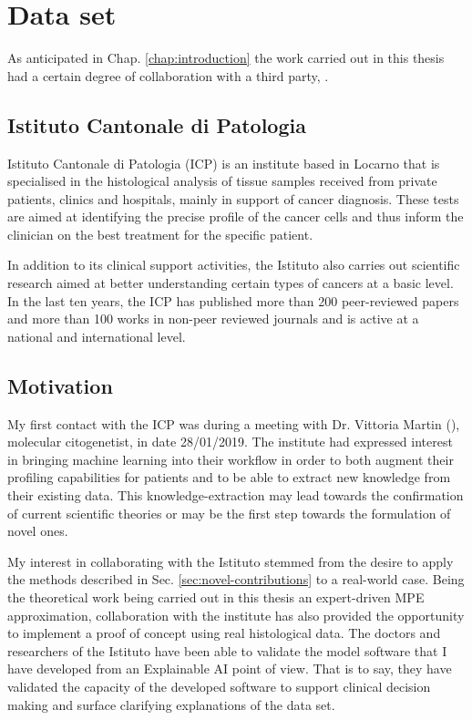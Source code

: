 
\section{Data set} \label{sec:data-set}
As anticipated in Chap. \ref{chap:introduction} the work carried out in this thesis had a certain degree of collaboration with a third party, \cite{istitutocantonalepresentazione}.

\subsection{Istituto Cantonale di Patologia}
Istituto Cantonale di Patologia (ICP) is an institute based in Locarno that is specialised in the histological analysis of tissue samples received from private patients, clinics and hospitals, mainly in support of cancer diagnosis.
These tests are aimed at identifying the precise profile of the cancer cells and thus inform the clinician on the best treatment for the specific patient.

In addition to its clinical support activities, the Istituto also carries out scientific research aimed at better understanding certain types of cancers at a basic level.
In the last ten years, the ICP has published more than 200 peer-reviewed papers and more than 100 works in non-peer reviewed journals and is active at a national and international level.

\subsection{Motivation}
My first contact with the ICP was during a meeting with Dr. Vittoria Martin (\cite{martin2012}), molecular citogenetist, in date 28/01/2019.
The institute had expressed interest in bringing machine learning into their workflow in order to both augment their profiling capabilities for patients and to be able to extract new knowledge from their existing data.
This knowledge-extraction may lead towards the confirmation of current scientific theories or may be the first step towards the formulation of novel ones.


My interest in collaborating with the Istituto stemmed from the desire to apply the methods described in Sec. \ref{sec:novel-contributions} to a real-world case.
Being the theoretical work being carried out in this thesis an expert-driven MPE approximation, collaboration with the institute has also provided the opportunity to implement a proof of concept using real histological data.
The doctors and researchers of the Istituto have been able to validate the model software that I have developed from an Explainable AI point of view.
That is to say, they have validated the capacity of the developed software to support clinical decision making and surface clarifying explanations of the data set.

